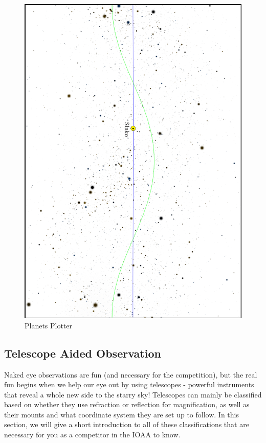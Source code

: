 \documentclass[a4paper,12pt]{extarticle}
\begin{document}
\begin{figure}[H]
	\centering
	\includegraphics[width=0.9\linewidth]{slovak_obs.png}
	\caption{Planets Plotter}
	\label{planets_plot}
\end{figure}

\clearpage
\subsection{Telescope Aided Observation}
Naked eye observations are fun (and necessary for the competition), but the real fun begins when we help our eye out by using telescopes - powerful instruments that reveal a whole new side to the starry sky! Telescopes can mainly be classified based on whether they use refraction or reflection for magnification, as well as their mounts and what coordinate system they are set up to follow. In this section, we will give a short introduction to all of these classifications that are necessary for you as a competitor in the IOAA to know.\\
\end{document}
